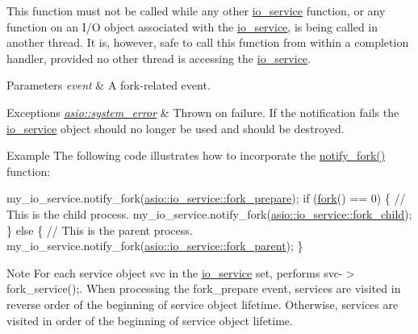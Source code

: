 This function must not be called while any other \hyperlink{classasio_1_1io__service}{io\+\_\+service} function, or any function on an I/\+O object associated with the \hyperlink{classasio_1_1io__service}{io\+\_\+service}, is being called in another thread. It is, however, safe to call this function from within a completion handler, provided no other thread is accessing the \hyperlink{classasio_1_1io__service}{io\+\_\+service}.


\begin{DoxyParams}{Parameters}
{\em event} & A fork-\/related event.\\
\hline
\end{DoxyParams}

\begin{DoxyExceptions}{Exceptions}
{\em \hyperlink{classasio_1_1system__error}{asio\+::system\+\_\+error}} & Thrown on failure. If the notification fails the \hyperlink{classasio_1_1io__service}{io\+\_\+service} object should no longer be used and should be destroyed.\\
\hline
\end{DoxyExceptions}
\begin{DoxyParagraph}{Example}
The following code illustrates how to incorporate the \hyperlink{classasio_1_1io__service_af1e9678ed8a80730fa86ad92225e0999}{notify\+\_\+fork()} function\+: 
\begin{DoxyCode}
 my\_io\_service.notify\_fork(\hyperlink{classasio_1_1io__service_a45f084ae64e601f7ead3f891d5ed0fc6a4155066cb5e3e7d9bd8f76581168e052}{asio::io\_service::fork\_prepare});
\textcolor{keywordflow}{if} (\hyperlink{yield_8hpp_ab2e49d0b8dbb3181c7d1f622fd5ea1b4}{fork}() == 0)
\{
  \textcolor{comment}{// This is the child process.}
  my\_io\_service.notify\_fork(\hyperlink{classasio_1_1io__service_a45f084ae64e601f7ead3f891d5ed0fc6a9d080c1e5e29bac7d4f6b9cfe875f031}{asio::io\_service::fork\_child});
\}
\textcolor{keywordflow}{else}
\{
  \textcolor{comment}{// This is the parent process.}
  my\_io\_service.notify\_fork(\hyperlink{classasio_1_1io__service_a45f084ae64e601f7ead3f891d5ed0fc6a8c78c0331f35f99f5e86e180bce88374}{asio::io\_service::fork\_parent});
\} 
\end{DoxyCode}

\end{DoxyParagraph}
\begin{DoxyNote}{Note}
For each service object {\ttfamily svc} in the \hyperlink{classasio_1_1io__service}{io\+\_\+service} set, performs {\ttfamily svc-\/$>$fork\+\_\+service();}. When processing the fork\+\_\+prepare event, services are visited in reverse order of the beginning of service object lifetime. Otherwise, services are visited in order of the beginning of service object lifetime. 
\end{DoxyNote}


